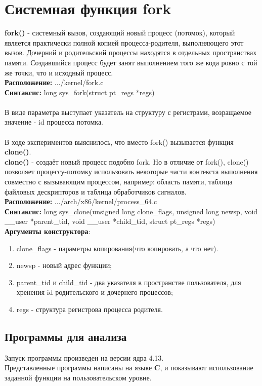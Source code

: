 \section{Системная функция fork}
\textbf{fork()}\cite{fork} - системный вызов, создающий новый процесс (потомок), который является практически полной копией процесса-родителя, выполняющего этот вызов. Дочерний и родительский процессы находятся в отдельных пространствах памяти.  Создавшийся процесс будет занят выполнением того же кода ровно с той же точки, что и исходный процесс.\\
\textbf{Расположение: }.../kernel/fork.c\\
\textbf{Синтаксис: }long sys\_fork(struct pt\_regs *regs)\\\\
В виде параметра выступает указатель на структуру с регистрами, возращаемое значение - id процесса потомка.\\\\
В ходе экспериментов выяснилось, что вместо fork() вызывается функция \textbf{clone()}.\\
\textbf{clone()}\cite{clone} - создаёт новый процесс подобно fork. Но в отличие от fork(), clone() позволяет процессу-потомку использовать некоторые части контекста выполнения совместно с вызывающим процессом, например: область памяти, таблица файловых дескрипторов и таблица обработчиков сигналов.\\
\textbf{Расположение: }.../arch/x86/kernel/process\_64.c\\
\textbf{Синтаксис: }long sys\_clone(unsigned long clone\_flags, unsigned long newsp, void \_\_user *parent\_tid, void \_\_user *child\_tid, struct pt\_regs *regs)\\
\textbf{Аргументы конструктора}:
\begin{enumerate}
\item clone\_flags - параметры копирования(что копировать, а что нет). 
\item newsp - новый адрес функции;
\item parent\_tid и child\_tid - два указателя в пространстве пользователя, для хренения id родительского и дочернего процессов;
\item regs - структура регистрова процесса родителя.
\end{enumerate}

\subsection{Программы для анализа}
Запуск программы произведен на версии ядра 4.13.\\
Представленные программы написаны на языке \textbf{C}, и показывают использование заданной функции на пользовательском уровне.

